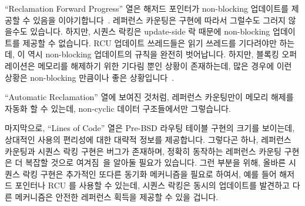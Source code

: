 ``Reclamation Forward Progress'' 열은 해저드 포인터가 non-blocking
업데이트를 제공할 수 있음을 이야기합니다~\cite{MagedMichael04a,HerlihyLM02}.
레퍼런스 카운팅은 구현에 따라서 그럴수도 그러지 않을수도 있습니다.
하지만, 시퀀스 락킹은 update-side 락 때문에 non-blocking 업데이트를 제공할 수
없습니다.
RCU 업데이트 쓰레드들은 읽기 쓰레드를 기다려야만 하는데, 이 역시 non-blocking
업데이트의 규칙을 완전히 벗어납니다.
하지만, 블록킹 오퍼레이션은 메모리를 해제하기 위한 기다림 뿐인 상황이
존재하는데, 많은 경우에 이런 상황은 non-blocking 만큼이나 좋은
상황입니다~\cite{MathieuDesnoyers2012URCU}.
\iffalse

The ``Reclamation Forward Progress'' row shows that hazard pointers
can provide non-blocking updates~\cite{MagedMichael04a,HerlihyLM02}.
Reference counting might or might not, depending on the implementation.
However, sequence locking cannot provide non-blocking updates, courtesy
of its update-side lock.
RCU updaters must wait on readers, which also rules out fully non-blocking
updates.
However, there are situations in which the only blocking operation is
a wait to free memory, which results in an situation that, for many
purposes, is as good as non-blocking~\cite{MathieuDesnoyers2012URCU}.
\fi

``Automatic Reclamation'' 열에 보여진 것처럼, 레퍼런스 카운팅만이 메모리 해제를
자동화 할 수 있는데, non-cyclic 데이터 구조들에서만 그렇습니다.

마지막으로, ``Lines of Code'' 열은 Pre-BSD 라우팅 테이블 구현의 크기를
보이는데, 상대적인 사용의 편리성에 대한 대략적 정보를 제공합니다.
그렇다곤 하나, 레퍼런스 카운팅과 시퀀스 락킹 구현은 버그가 존재하며, 정확히
동작하는 레퍼런스 카운팅 구현은 더 복잡할 것으로
여겨짐~\cite{Valois95a,MagedMichael95a}을 알아둘 필요가 있습니다.
그런 부분을 위해, 올바른 시퀀스 락킹 구현은 추가적인 또다른 동기화 메커니즘을
필요로 하여서, 예를 들어 해저드 포인터나 RCU 를 사용할 수 있는데, 시퀀스 락킹은
동시의 업데이트를 발견하고 다른 메커니즘은 안전한 레퍼런스 획득을 제공할 수
있을 겁니다.
\iffalse

As shown in the ``Automatic Reclamation'' row, only reference
counting can automate freeing of memory, and even then only
for non-cyclic data structures.

Finally, the ``Lines of Code'' row shows the size of the Pre-BSD
Routing Table implementations, giving a rough idea of relative ease of use.
That said, it is important to note that the reference-counting and
sequence-locking implementations are buggy, and that a correct
reference-counting implementation is considerably
more complex~\cite{Valois95a,MagedMichael95a}.
For its part, a correct sequence-locking implementation requires
the addition of some other synchronization mechanism, for example,
hazard pointers or RCU, so that sequence locking detects concurrent
updates and the other mechanism provides safe reference acquisition.
\fi

